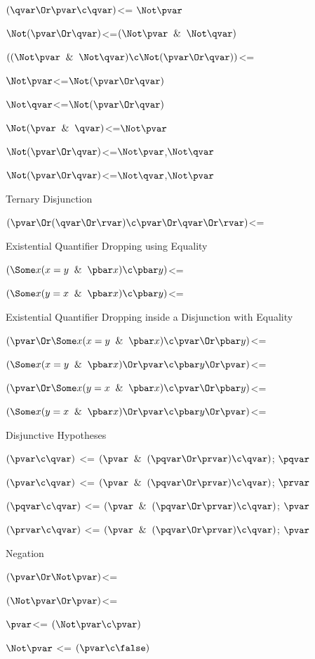 $(\qvar \Or \pvar \c \qvar)$<= $\Not \pvar$

$\Not(\pvar \Or \qvar)$<=$(\Not \pvar \And \Not \qvar)$

$((\Not \pvar \And \Not \qvar) \c \Not(\pvar \Or \qvar))$<=

$\Not \pvar$<=$\Not(\pvar \Or \qvar)$

$\Not \qvar$<=$\Not(\pvar \Or \qvar)$

$\Not(\pvar \And \qvar)$<=$\Not \pvar$

$\Not(\pvar \Or \qvar)$<=$\Not \pvar$,$\Not \qvar$

$\Not(\pvar \Or \qvar)$<=$\Not \qvar$,$\Not \pvar$


\lineb

Ternary Disjunction
\lineb

$(\pvar \Or (\qvar \Or \rvar) \c \pvar \Or \qvar \Or \rvar)$<=
\lineb

Existential Quantifier Dropping using Equality
\lineb

$(\Some x (x = y \And \pbar x) \c \pbar y)$<=

$(\Some x (y = x \And \pbar x) \c \pbar y)$<=

Existential Quantifier Dropping inside a Disjunction with Equality
\lineb

$(\pvar \Or \Some x (x = y \And \pbar x) \c \pvar \Or \pbar y)$<=

$(\Some x (x = y \And \pbar x)\Or \pvar \c \pbar y \Or \pvar)$<=

$(\pvar \Or \Some x (y = x \And \pbar x) \c \pvar \Or \pbar y)$<=

$(\Some x (y = x \And \pbar x)\Or \pvar \c \pbar y \Or \pvar)$<=

Disjunctive Hypotheses
\lineb

$(\pvar \c \qvar)$ <= $(\pvar \And (\pqvar \Or \prvar) \c \qvar)$; $\pqvar$

$(\pvar \c \qvar)$ <= $(\pvar \And (\pqvar \Or \prvar) \c \qvar)$; $\prvar$

$(\pqvar \c \qvar)$ <= $(\pvar \And (\pqvar \Or \prvar) \c \qvar)$; $\pvar$

$(\prvar \c \qvar)$ <= $(\pvar \And (\pqvar \Or \prvar) \c \qvar)$; $\pvar$
\lineb


Negation
\lineb

$(\pvar \Or \Not \pvar)$<=

$(\Not \pvar \Or \pvar)$<=

$\pvar$<= $(\Not\pvar \c \pvar)$

$\Not \pvar $ <= $(\pvar \c \false)$

